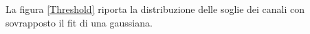
La figura \ref{Threshold} riporta la distribuzione delle soglie dei canali con sovrapposto il fit di una gaussiana.

